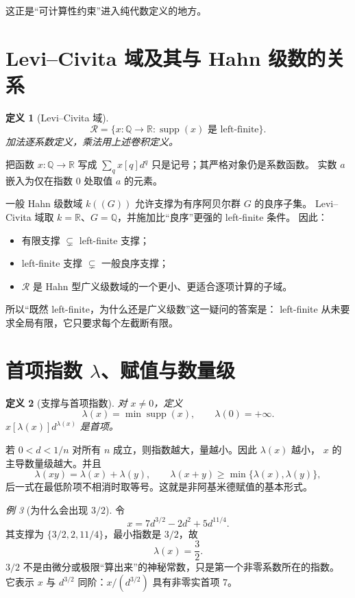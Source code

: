 \documentclass[11pt,a4paper]{article}
\newtheorem{definition}{定义}[section]
\theoremstyle{remark}
\newtheorem{example}[definition]{例}
\newcommand{\LC}{\mathcal R}
\newcommand{\supp}{\operatorname{supp}}
\newcommand{\R}{\mathbb R}
\newcommand{\Q}{\mathbb Q}
\begin{document}
这正是“可计算性约束”进入纯代数定义的地方。

\section{Levi--Civita 域及其与 Hahn 级数的关系}

\begin{definition}[Levi--Civita 域]
\[
\LC=\{x:\Q\to\R:\supp(x)\text{ 是 left-finite}
\}.
\]
加法逐系数定义，乘法用上述卷积定义。
\end{definition}

把函数 $x:\Q\to\R$ 写成 $\sum_qx[q]d^q$ 只是记号；其严格对象仍是系数函数。
实数 $a$ 嵌入为仅在指数 $0$ 处取值 $a$ 的元素。

一般 Hahn 级数域 $k((G))$ 允许支撑为有序阿贝尔群 $G$ 的良序子集。
Levi--Civita 域取 $k=\R$、$G=\Q$，并施加比“良序”更强的 left-finite 条件。
因此：

\begin{itemize}
\item 有限支撑 $\subsetneq$ left-finite 支撑；
\item left-finite 支撑 $\subsetneq$ 一般良序支撑；
\item $\LC$ 是 Hahn 型广义级数域的一个更小、更适合逐项计算的子域。
\end{itemize}

所以“既然 left-finite，为什么还是广义级数”这一疑问的答案是：
left-finite 从未要求全局有限，它只要求每个左截断有限。

\section{首项指数 $\lambda$、赋值与数量级}

\begin{definition}[支撑与首项指数]
对 $x\ne0$，定义
\[
\lambda(x)=\min\supp(x),\qquad \lambda(0)=+\infty.
\]
$x[\lambda(x)]d^{\lambda(x)}$ 是首项。
\end{definition}

若 $0<d<1/n$ 对所有 $n$ 成立，则指数越大，量越小。因此 $\lambda(x)$ 越小，
$x$ 的主导数量级越大。并且
\[
\lambda(xy)=\lambda(x)+\lambda(y),\qquad
\lambda(x+y)\ge\min\{\lambda(x),\lambda(y)\},
\]
后一式在最低阶项不相消时取等号。这就是非阿基米德赋值的基本形式。

\begin{example}[为什么会出现 $3/2$]
令
\[
x=7d^{3/2}-2d^2+5d^{11/4}.
\]
其支撑为 $\{3/2,2,11/4\}$，最小指数是 $3/2$，故
\[
\lambda(x)=\frac32.
\]
$3/2$ 不是由微分或极限“算出来”的神秘常数，只是第一个非零系数所在的指数。
它表示 $x$ 与 $d^{3/2}$ 同阶：$x/(d^{3/2})$ 具有非零实首项 $7$。
\end{example}
\end{document}
